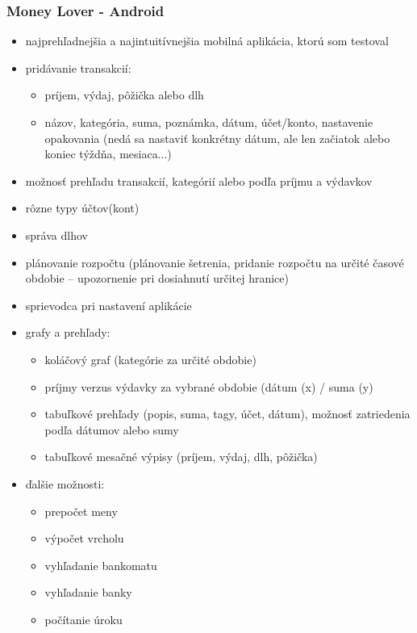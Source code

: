\documentclass[12pt,onesided]{book}
\begin{document}
\subsubsection{Money Lover - Android \cite{MoneyLover}\ }
\begin{itemize}
\item{najprehľadnejšia a najintuitívnejšia mobilná aplikácia, ktorú som testoval}
\item{pridávanie transakcií:}
\begin{itemize}
\item{príjem, výdaj, pôžička alebo dlh}
\item{názov, kategória, suma, poznámka, dátum, účet/konto, nastavenie opakovania (nedá sa nastaviť konkrétny dátum, ale len začiatok alebo koniec týždňa, mesiaca...)}
\end{itemize}
\item{možnosť prehľadu transakcií, kategórií alebo podľa príjmu a výdavkov}
\item{rôzne typy účtov(kont)}
\item{správa dlhov}
\item{plánovanie rozpočtu (plánovanie šetrenia, pridanie rozpočtu na určité časové obdobie – upozornenie pri dosiahnutí určitej hranice)}
\item{sprievodca pri nastavení aplikácie}
\item{grafy a prehľady:}
\begin{itemize}
\item{koláčový graf (kategórie za určité obdobie)}
\item{príjmy verzus výdavky za vybrané obdobie (dátum (x) / suma (y)}
\item{tabuľkové prehľady (popis, suma, tagy, účet, dátum), možnosť zatriedenia podľa dátumov alebo sumy}
\item{tabuľkové mesačné výpisy (príjem, výdaj, dlh, pôžička)}
\end{itemize}
\item{ďalšie možnosti:}
\begin{itemize}
\item{prepočet meny}
\item{výpočet vrcholu}
\item{vyhľadanie bankomatu}
\item{vyhľadanie banky}
\item{počítanie úroku}
\end{itemize}
\end{itemize}
\end{document}

